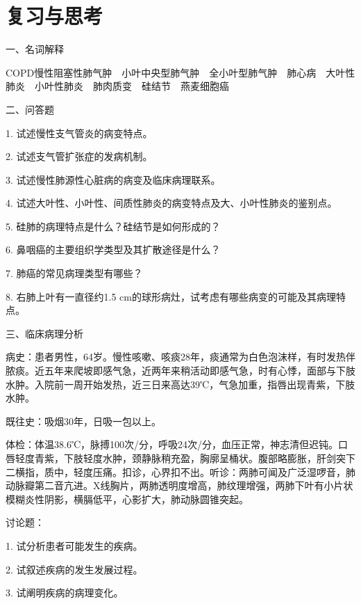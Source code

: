 \section*{复习与思考}

{一、名词解释}

COPD慢性阻塞性肺气肿　小叶中央型肺气肿　全小叶型肺气肿　肺心病　大叶性肺炎　小叶性肺炎　肺肉质变　硅结节　燕麦细胞癌

{二、问答题}

1. 试述慢性支气管炎的病变特点。

2. 试述支气管扩张症的发病机制。

3. 试述慢性肺源性心脏病的病变及临床病理联系。

4. 试述大叶性、小叶性、间质性肺炎的病变特点及大、小叶性肺炎的鉴别点。

5. 硅肺的病理特点是什么？硅结节是如何形成的？

6. 鼻咽癌的主要组织学类型及其扩散途径是什么？

7. 肺癌的常见病理类型有哪些？

8. 右肺上叶有一直径约1.5
cm的球形病灶，试考虑有哪些病变的可能及其病理特点。

{三、临床病理分析}

病史：患者男性，64岁。慢性咳嗽、咳痰28年，痰通常为白色泡沫样，有时发热伴脓痰。近五年来爬坡即感气急，近两年来稍活动即感气急，时有心悸，面部与下肢水肿。入院前一周开始发热，近三日来高达39℃，气急加重，指唇出现青紫，下肢水肿。

既往史：吸烟30年，日吸一包以上。

体检：体温38.6℃，脉搏100次/分，呼吸24次/分，血压正常，神志清但迟钝。口唇轻度青紫，下肢轻度水肿，颈静脉稍充盈，胸廓呈桶状。腹部略膨胀，肝剑突下二横指，质中，轻度压痛。扣诊，心界扣不出。听诊：两肺可闻及广泛湿啰音，肺动脉瓣第二音亢进。X线胸片，两肺透明度增高，肺纹理增强，两肺下叶有小片状模糊炎性阴影，横膈低平，心影扩大，肺动脉圆锥突起。

讨论题：

1. 试分析患者可能发生的疾病。

2. 试叙述疾病的发生发展过程。

3. 试阐明疾病的病理变化。